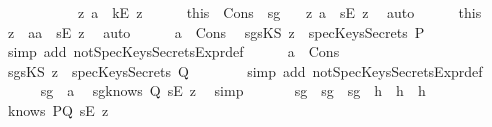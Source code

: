 \begin{isabellebody}
\ \ \isamarkupfalse%
\ \isanewline
\ \ \ \ \isamarkupfalse%
\ {\isachardoublequoteopen}{\isasymnot}\ {\isacharparenleft}{\isasymexists}z{}{\isachardot}\ a\ {\isacharequal}\ kE\ z{}{\isacharparenright}{\isachardoublequoteclose}\isanewline
\ \ \ \ \isamarkupfalse%
\ this\ \ Cons\ \ sg{}\ \isamarkupfalse%
\ {\isachardoublequoteopen}{\isasymexists}\ z{}{\isachardot}\ a\ {\isacharequal}\ {\isacharparenleft}sE\ z{}{\isacharparenright}{\isachardoublequoteclose}\ \isamarkupfalse%
\ auto\isanewline
\ \ \ \ \isamarkupfalse%
\ this\ \isamarkupfalse%
\ z\ \ a{}{\isacharcolon}{\isachardoublequoteopen}a\ {\isacharequal}\ {\isacharparenleft}sE\ z{\isacharparenright}{\isachardoublequoteclose}\ \isamarkupfalse%
\ auto\isanewline
\ \ \ \ \isamarkupfalse%
\ a{}\ \ Cons\ \isamarkupfalse%
\ sg{}{\isacharcolon}{\isachardoublequoteopen}{\isacharparenleft}sKS\ z{\isacharparenright}\ {\isasymnotin}\ specKeysSecrets\ P{\isachardoublequoteclose}\isanewline
\ \ \ \ \ \ \isamarkupfalse%
\ {\isacharparenleft}simp\ add{\isacharcolon}\ notSpecKeysSecretsExpr{\isacharunderscore}def{\isacharparenright}\isanewline
\ \ \ \ \isamarkupfalse%
\ a{}\ \ Cons\ \isamarkupfalse%
\ sg{}{\isacharcolon}{\isachardoublequoteopen}{\isacharparenleft}sKS\ z{\isacharparenright}\ {\isasymnotin}\ specKeysSecrets\ Q{\isachardoublequoteclose}\isanewline
\ \ \ \ \ \ \isamarkupfalse%
\ {\isacharparenleft}simp\ add{\isacharcolon}\ notSpecKeysSecretsExpr{\isacharunderscore}def{\isacharparenright}\isanewline
\ \ \ \ \isamarkupfalse%
\ sg{}\ \ a{}\ \isamarkupfalse%
\ sg{}{}{\isacharcolon}{\isachardoublequoteopen}knows\ Q\ {\isacharbrackleft}sE\ z{\isacharbrackright}{\isachardoublequoteclose}\ \isamarkupfalse%
\ simp\ \isanewline
\ \ \ \ \isamarkupfalse%
\ sg{}\ \ sg{}\ \ sg{}{}\ \ h{}\ \ h{}\ \ h{}\ \ \isanewline
\ \ \ \ \ \ \isamarkupfalse%
\ {\isachardoublequoteopen}knows\ PQ\ {\isacharbrackleft}sE\ z{\isacharbrackright}{\isachardoublequoteclose}\ \isanewline

\end{isabellebody}
